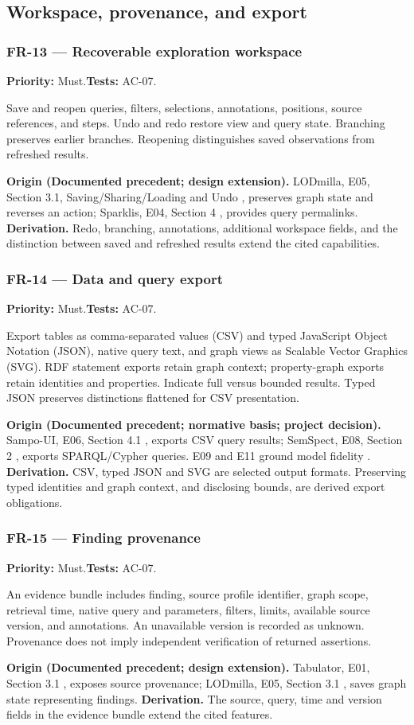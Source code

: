 \documentclass[11pt,a4paper]{article}
\newcommand{\req}[4]{\subsubsection*{#1 --- #2}\phantomsection\label{req:#1}\textbf{Priority:} #3.\quad\textbf{Tests:} #4.\par}
\newcommand{\origin}[3]{\par{\small\textbf{Origin (#1).} #2 \textbf{Derivation.} #3\par}}
\begin{document}
\subsection{Workspace, provenance, and export}
\par\noindent\begin{minipage}{\linewidth}
\req{FR-13}{Recoverable exploration workspace}{Must}{AC-07}
Save and reopen queries, filters, selections, annotations, positions, source references, and steps. Undo and redo restore view and query state. Branching preserves earlier branches. Reopening distinguishes saved observations from refreshed results.
\origin{Documented precedent; design extension}{LODmilla, E05, Section 3.1, Saving/\allowbreak Sharing/\allowbreak Loading and Undo \citep{lodmilla}, preserves graph state and reverses an action; Sparklis, E04, Section 4 \citep{sparklis}, provides query permalinks.}{Redo, branching, annotations, additional workspace fields, and the distinction between saved and refreshed results extend the cited capabilities.}
\end{minipage}\par
\par\noindent\begin{minipage}{\linewidth}
\req{FR-14}{Data and query export}{Must}{AC-07}
Export tables as comma-separated values (CSV) and typed JavaScript Object Notation (JSON), native query text, and graph views as Scalable Vector Graphics (SVG). RDF statement exports retain graph context; property-graph exports retain identities and properties. Indicate full versus bounded results. Typed JSON preserves distinctions flattened for CSV presentation.
\origin{Documented precedent; normative basis; project decision}{Sampo-UI, E06, Section 4.1 \citep{sampoui}, exports CSV query results; SemSpect, E08, Section 2 \citep{semspect}, exports SPARQL/Cypher queries. E09 and E11 ground model fidelity \citep{rdfconcepts,opencypher}.}{CSV, typed JSON and SVG are selected output formats. Preserving typed identities and graph context, and disclosing bounds, are derived export obligations.}
\end{minipage}\par
\par\noindent\begin{minipage}{\linewidth}
\req{FR-15}{Finding provenance}{Must}{AC-07}
An evidence bundle includes finding, source profile identifier, graph scope, retrieval time, native query and parameters, filters, limits, available source version, and annotations. An unavailable version is recorded as unknown. Provenance does not imply independent verification of returned assertions.
\origin{Documented precedent; design extension}{Tabulator, E01, Section 3.1 \citep{tabulator}, exposes source provenance; LODmilla, E05, Section 3.1 \citep{lodmilla}, saves graph state representing findings.}{The source, query, time and version fields in the evidence bundle extend the cited features.}
\end{minipage}\par
\end{document}

